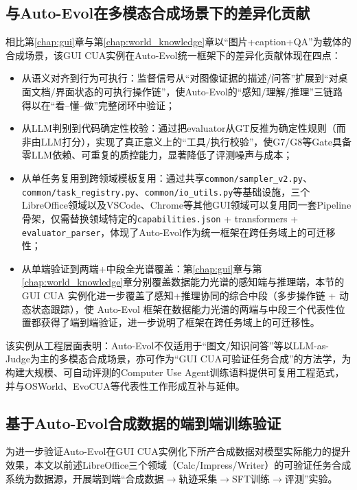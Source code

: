 \subsection{与Auto-Evol在多模态合成场景下的差异化贡献}
相比第\ref{chap:gui}章与第\ref{chap:world_knowledge}章以“图片+caption+QA”为载体的合成场景，该GUI CUA实例在Auto-Evol统一框架下的差异化贡献体现在四点：
\begin{itemize}
  \item 从语义对齐到行为可执行：监督信号从“对图像证据的描述/问答”扩展到“对桌面文档/界面状态的可执行操作链”，使Auto-Evol的“感知/理解/推理”三链路得以在“看--懂--做”完整闭环中验证；
  \item 从LLM判别到代码确定性校验：通过把evaluator从GT反推为确定性规则（而非由LLM打分），实现了真正意义上的“工具/执行校验”，使G7/G8等Gate具备零LLM依赖、可重复的质控能力，显著降低了评测噪声与成本；
  \item 从单任务复用到跨领域模板复用：通过共享\texttt{common/\allowbreak sampler\_v2.py}、\allowbreak{}\texttt{common/\allowbreak task\_registry.py}、\allowbreak{}\texttt{common/\allowbreak io\_utils.py}等基础设施，三个LibreOffice领域以及VSCode、Chrome等其他GUI领域可以复用同一套Pipeline骨架，仅需替换领域特定的\texttt{capabilities.json} + transformers + \texttt{evaluator\_parser}，体现了Auto-Evol作为统一框架在跨任务域上的可迁移性；
  \item 从单端验证到两端+中段全光谱覆盖：第\ref{chap:gui}章与第\ref{chap:world_knowledge}章分别覆盖数据能力光谱的感知端与推理端，本节的 GUI CUA 实例化进一步覆盖了感知+推理协同的综合中段（多步操作链 + 动态状态跟踪），使 Auto-Evol 框架在数据能力光谱的两端与中段三个代表性位置都获得了端到端验证，进一步说明了框架在跨任务域上的可迁移性。
\end{itemize}

该实例从工程层面表明：Auto-Evol不仅适用于“图文/知识问答”等以LLM-as-Judge为主的多模态合成场景，亦可作为“GUI CUA可验证任务合成”的方法学，为构建大规模、可自动评测的Computer Use Agent训练语料提供可复用工程范式，并与OSWorld\citep{xie2024osworld}、EvoCUA\citep{xue2026evocua}等代表性工作形成互补与延伸。

\subsection{基于Auto-Evol合成数据的端到端训练验证}
\label{subsec:auto_evol_gui_cua_train}

为进一步验证Auto-Evol在GUI CUA实例化下所产合成数据对模型实际能力的提升效果，本文以前述LibreOffice三个领域（Calc/\allowbreak Impress/\allowbreak Writer）的可验证任务合成系统为数据源，开展端到端“合成数据$\rightarrow$轨迹采集$\rightarrow$SFT训练$\rightarrow$评测”实验。

